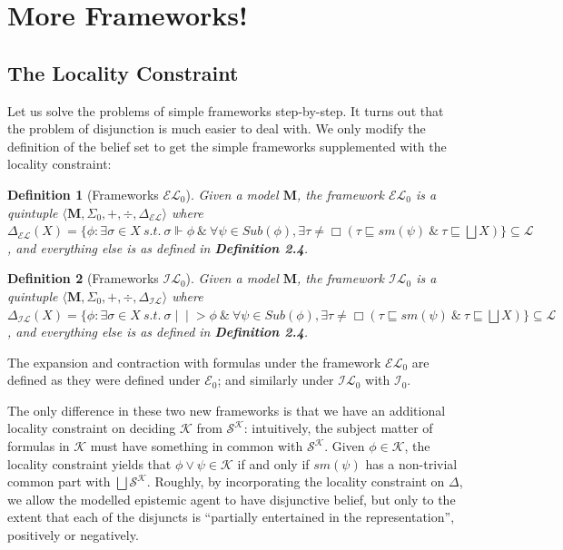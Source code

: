 \documentclass[12pt]{article}
\newtheorem{definition}{Definition}[section]
\newcommand{\ver}{\Vdash}
\newcommand{\inever}{\mid \! \mid \!\!>}
\newcommand{\K}{\mathcal{K}}
\newcommand{\SK}{\mathcal{S}^\mathcal{K}}
\begin{document}
\section{More Frameworks!}
\subsection{The Locality Constraint}
Let us solve the problems of simple frameworks step-by-step. It turns out that the problem of disjunction is much easier to deal with. We only modify the definition of the belief set to get the simple frameworks supplemented with the locality constraint:
\begin{definition}[Frameworks $\mathcal{EL}_0$]
    Given a model $\bm{M}$, the framework $\mathcal{EL}_0$ is a quintuple $\langle \bm{M}, \Sigma_0, +, \div, \Delta_{\mathcal{EL}} \rangle$ where $\Delta_{\mathcal{EL}} (X) = \{\phi : \exists \sigma\in X \ s.t. \ \sigma \ver \phi \ \& \ \forall \psi \in Sub(\phi), \exists \tau \neq \Box (\tau \sqsubseteq sm(\psi) \ \& \ \tau \sqsubseteq \bigsqcup X)\} \subseteq \mathcal{L}$, and everything else is as defined in \emph{\textbf{Definition 2.4}}. 
\end{definition}
\begin{definition}[Frameworks $\mathcal{IL}_0$]
    Given a model $\bm{M}$, the framework $\mathcal{IL}_0$ is a quintuple $\langle \bm{M}, \Sigma_0, +, \div, \Delta_{\mathcal{IL}} \rangle$ where $\Delta_{\mathcal{IL}} (X) = \{\phi : \exists \sigma \in X \ s.t. \ \sigma \inever \phi \ \& \ \forall \psi \in Sub(\phi), \exists \tau \neq \Box (\tau \sqsubseteq sm(\psi) \ \& \ \tau \sqsubseteq \bigsqcup X)\} \subseteq \mathcal{L}$, and everything else is as defined in \emph{\textbf{Definition 2.4}}. 
\end{definition}
The expansion and contraction with formulas under the framework $\mathcal{EL}_0$ are defined as they were defined under $\mathcal{E}_0$; and similarly under $\mathcal{IL}_0$ with $\mathcal{I}_0$. 
\par
The only difference in these two new frameworks is that we have an additional locality constraint on deciding $\K$ from $\SK$: intuitively, the subject matter of formulas in $\K$ must have something in common with $\SK$. Given $\phi \in \K$, the locality constraint yields that $\phi \lor \psi \in \K$ if and only if  $sm(\psi)$ has a non-trivial common part with $\bigsqcup \SK$. Roughly, by incorporating the locality constraint on $\Delta$, we allow the modelled epistemic agent to have disjunctive belief, but only to the extent that each of the disjuncts is ``partially entertained in the representation'', positively or negatively. 
\end{document}
